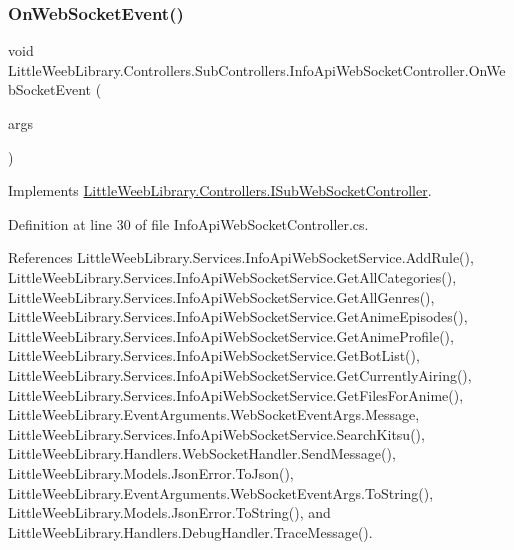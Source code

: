 \subsubsection{\texorpdfstring{On\+Web\+Socket\+Event()}{OnWebSocketEvent()}}
{\footnotesize\ttfamily void Little\+Weeb\+Library.\+Controllers.\+Sub\+Controllers.\+Info\+Api\+Web\+Socket\+Controller.\+On\+Web\+Socket\+Event (\begin{DoxyParamCaption}\item[{\mbox{\hyperlink{class_little_weeb_library_1_1_event_arguments_1_1_web_socket_event_args}{Web\+Socket\+Event\+Args}}}]{args }\end{DoxyParamCaption})}



Implements \mbox{\hyperlink{interface_little_weeb_library_1_1_controllers_1_1_i_sub_web_socket_controller_adcb26b7b397d6a67ccbf114008c29985}{Little\+Weeb\+Library.\+Controllers.\+I\+Sub\+Web\+Socket\+Controller}}.



Definition at line 30 of file Info\+Api\+Web\+Socket\+Controller.\+cs.



References Little\+Weeb\+Library.\+Services.\+Info\+Api\+Web\+Socket\+Service.\+Add\+Rule(), Little\+Weeb\+Library.\+Services.\+Info\+Api\+Web\+Socket\+Service.\+Get\+All\+Categories(), Little\+Weeb\+Library.\+Services.\+Info\+Api\+Web\+Socket\+Service.\+Get\+All\+Genres(), Little\+Weeb\+Library.\+Services.\+Info\+Api\+Web\+Socket\+Service.\+Get\+Anime\+Episodes(), Little\+Weeb\+Library.\+Services.\+Info\+Api\+Web\+Socket\+Service.\+Get\+Anime\+Profile(), Little\+Weeb\+Library.\+Services.\+Info\+Api\+Web\+Socket\+Service.\+Get\+Bot\+List(), Little\+Weeb\+Library.\+Services.\+Info\+Api\+Web\+Socket\+Service.\+Get\+Currently\+Airing(), Little\+Weeb\+Library.\+Services.\+Info\+Api\+Web\+Socket\+Service.\+Get\+Files\+For\+Anime(), Little\+Weeb\+Library.\+Event\+Arguments.\+Web\+Socket\+Event\+Args.\+Message, Little\+Weeb\+Library.\+Services.\+Info\+Api\+Web\+Socket\+Service.\+Search\+Kitsu(), Little\+Weeb\+Library.\+Handlers.\+Web\+Socket\+Handler.\+Send\+Message(), Little\+Weeb\+Library.\+Models.\+Json\+Error.\+To\+Json(), Little\+Weeb\+Library.\+Event\+Arguments.\+Web\+Socket\+Event\+Args.\+To\+String(), Little\+Weeb\+Library.\+Models.\+Json\+Error.\+To\+String(), and Little\+Weeb\+Library.\+Handlers.\+Debug\+Handler.\+Trace\+Message().



